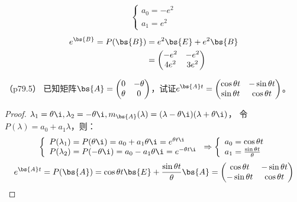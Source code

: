\documentclass[12pt, a4paper, oneside, UTF8]{ctexbook}
\begin{document}
\begin{solution}
\begin{enumerate}[label=(\arabic*)]
\begin{align*}
        \left\{
            \begin{array}{ll}
                a_0=-e^2\\
                a_1=e^2
            \end{array}
            \right.
    \end{align*}
    \begin{align*}
        e^{\bs{B}}=P(\bs{B})
    &=e^2\bs{E}+e^2\bs{B}\\
    &=\begin{pmatrix}
        -e^2 &-e^2 \\
        4e^2 & 3e^2
    \end{pmatrix}
    \end{align*} 
    \end{enumerate}
\end{solution}


\begin{question}（p79.5）
    \label{上题}
    已知矩阵$\bs{A}=\begin{pmatrix}
        0 & -\theta \\
        \theta & 0
    \end{pmatrix}$，试证$e^{\bs{A}t}=\begin{pmatrix}
        \cos \theta t & -\sin \theta t\\
        \sin \theta t & \cos \theta t
    \end{pmatrix}$。
\end{question}


\begin{proof} 
    $\lambda_1=\theta \i,\lambda_2=-\theta \i,m_{\bs{A}}(\lambda)=(\lambda-\theta \i)(\lambda+\theta \i)$，
    令$P(\lambda)=a_0+a_1\lambda$，则：
    \begin{align*}
        \left\{
            \begin{array}{ll}
                P(\lambda_1)=P(\theta \i)=a_0+a_1 \theta \i=e^{\theta t \i}\\
                P(\lambda_2)=P(-\theta \i)=a_0-a_1 \theta \i=e^{-\theta t \i}
            \end{array}
            \right.
            \Rightarrow
            \left\{
                \begin{array}{ll}
                    a_0=\cos \theta t\\
                    a_1=\frac{\sin \theta t}{\theta}
                \end{array}
                \right.
    \end{align*}
    \begin{align*}
        e^{\bs{A}t}=P(\bs{A})
    =\cos \theta t\bs{E}+\frac{\sin \theta t}{\theta} \bs{A}
    =\begin{pmatrix}
        \cos \theta t &-\sin \theta t \\
        -\sin \theta t & \cos \theta t
    \end{pmatrix}
    \end{align*} 
\end{proof}
\end{document}
